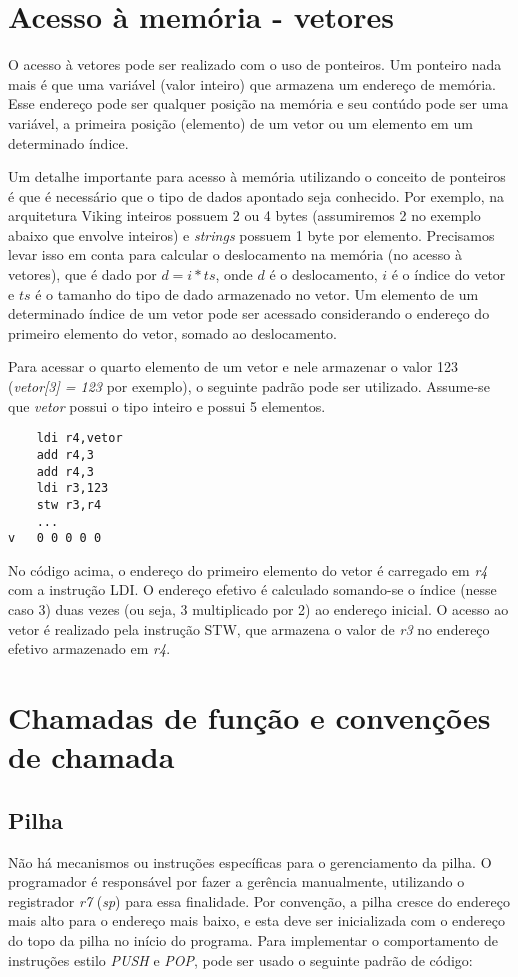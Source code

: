 \documentclass{extreport}
\begin{document}
\section{Acesso à memória - vetores}

O acesso à vetores pode ser realizado com o uso de ponteiros. Um ponteiro nada mais é que uma variável (valor inteiro) que armazena um endereço de memória. Esse endereço pode ser qualquer posição na memória e seu contúdo pode ser uma variável, a primeira posição (elemento) de um vetor ou um elemento em um determinado índice.

Um detalhe importante para acesso à memória utilizando o conceito de ponteiros é que é necessário que o tipo de dados apontado seja conhecido. Por exemplo, na arquitetura Viking inteiros possuem 2 ou 4 bytes (assumiremos 2 no exemplo abaixo que envolve inteiros) e \textit{strings} possuem 1 byte por elemento. Precisamos levar isso em conta para calcular o deslocamento na memória (no acesso à vetores), que é dado por $d = i * ts$, onde $d$ é o deslocamento, $i$ é o índice do vetor e $ts$ é o tamanho do tipo de dado armazenado no vetor. Um elemento de um determinado índice de um vetor pode ser acessado considerando o endereço do primeiro elemento do vetor, somado ao deslocamento.

Para acessar o quarto elemento de um vetor e nele armazenar o valor 123 (\textit{vetor[3] = 123} por exemplo), o seguinte padrão pode ser utilizado. Assume-se que \textit{vetor} possui o tipo inteiro e possui 5 elementos.

\begin{verbatim}
    ldi r4,vetor
    add r4,3
    add r4,3
    ldi r3,123
    stw r3,r4
    ...
v   0 0 0 0 0
\end{verbatim}

No código acima, o endereço do primeiro elemento do vetor é carregado em \textit{r4} com a instrução LDI. O endereço efetivo é calculado somando-se o índice (nesse caso 3) duas vezes (ou seja, 3 multiplicado por 2) ao endereço inicial. O acesso ao vetor é realizado pela instrução STW, que armazena o valor de \textit{r3} no endereço efetivo armazenado em \textit{r4}.

\section{Chamadas de função e convenções de chamada}
\label{ref:fcalls_conv}

\subsection{Pilha}
\label{ref:stack}
Não há mecanismos ou instruções específicas para o gerenciamento da pilha. O programador é responsável por fazer a gerência manualmente, utilizando o registrador \textit{r7} (\textit{sp}) para essa finalidade. Por convenção, a pilha cresce do endereço mais alto para o endereço mais baixo, e esta deve ser inicializada com o endereço do topo da pilha no início do programa. Para implementar o comportamento de instruções estilo \textit{PUSH} e \textit{POP}, pode ser usado o seguinte padrão de código:
\end{document}
